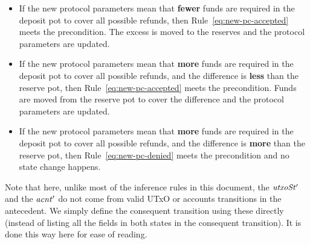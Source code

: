 \begin{itemize}
  \item If the new protocol parameters mean that \textbf{fewer} funds are required in the
    deposit pot to cover all possible refunds, then Rule~\ref{eq:new-pc-accepted} meets
    the precondition. The excess is moved to the reserves and the protocol parameters are updated.

  \item If the new protocol parameters mean that \textbf{more} funds are required in the
    deposit pot to cover all possible refunds, and the difference is \textbf{less} than
    the reserve pot, then Rule~\ref{eq:new-pc-accepted} meets the precondition.  Funds are moved
    from the reserve pot to cover the difference and the protocol parameters are updated.

  \item If the new protocol parameters mean that \textbf{more} funds are required in the
    deposit pot to cover all possible refunds, and the difference is \textbf{more} than
    the reserve pot, then Rule~\ref{eq:new-pc-denied} meets the precondition and no state change happens.
\end{itemize}

Note that here, unlike most of the inference rules in this document,
the $\mathit{utxoSt'}$ and the $\mathit{acnt'}$ do not come from valid UTxO or
accounts transitions in the antecedent. We simply define the consequent
transition using these directly (instead of listing all the fields in both
states in the consequent transition). It is done this way here
for ease of reading.

